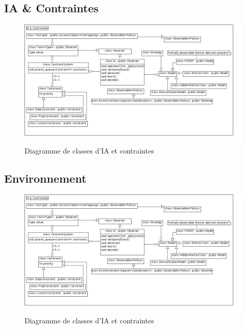 \subsection{IA \& Contraintes}
\begin{figure}[!h]\centering
   \includegraphics[scale=0.5]{images/c_ia_contraintes.png}
   \caption{\label{c_ia_contraintes} Diagramme de classes d'IA et contraintes}
\end{figure}

\subsection{Environnement}
\begin{figure}[!h]\centering
   \includegraphics[scale=0.5]{images/c_ia_contraintes.png}
   \caption{\label{c_ia_contraintes} Diagramme de classes d'IA et contraintes}
\end{figure}
